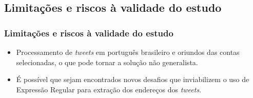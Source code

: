 \documentclass{beamer}
\begin{document}
\subsection{Limitações e riscos à validade do estudo}
\begin{frame}
\frametitle{Limitações e riscos à validade do estudo}
\begin{itemize}
\item Processamento de \textit{tweets} em português brasileiro e oriundos das contas selecionadas, o que pode tornar a solução não generalista. 
\item É possível que sejam encontrados novos desafios que inviabilizem o uso de Expressão Regular para extração dos endereços dos \textit{tweets}.
\end{itemize}
\end{frame}
\end{document}
